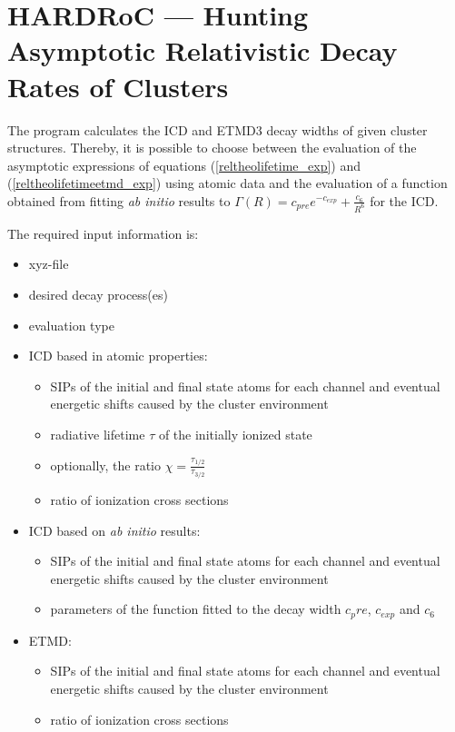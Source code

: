 \section{HARDRoC --- Hunting Asymptotic Relativistic Decay Rates of Clusters}

The program calculates the \ac{ICD} and \ac{ETMD}3 decay widths
of given cluster structures. Thereby, it is possible to choose between
the evaluation of the asymptotic expressions of equations
(\ref{reltheolifetime_exp}) and (\ref{reltheolifetimeetmd_exp}) using
atomic data and the evaluation of a function obtained from fitting
\emph{ab initio} results to $\Gamma(R) = c_{pre} e^{-c_{exp}} + \frac{c_6}{R^6}$
for the ICD.

The required input information is:
\begin{itemize}
 \item xyz-file
 \item desired decay process(es)
 \item evaluation type
 \item ICD based in atomic properties:
       \begin{itemize}
        \item \ac{SIP}s of the initial and final state atoms for each channel and
              eventual energetic shifts caused by the cluster environment
        \item radiative lifetime $\tau$ of the initially ionized state
        \item optionally, the ratio $\chi=\frac{\tau_{1/2}}{\tau_{3/2}}$
        \item ratio of ionization cross sections
       \end{itemize}
 \item ICD based on \emph{ab initio} results:
       \begin{itemize}
        \item \ac{SIP}s of the initial and final state atoms for each channel and
              eventual energetic shifts caused by the cluster environment
        \item parameters of the function fitted to the decay width $c_pre$,
              $c_{exp}$ and $c_6$
       \end{itemize}
 \item ETMD: 
       \begin{itemize}
        \item \ac{SIP}s of the initial and final state atoms for each channel and
              eventual energetic shifts caused by the cluster environment
        \item ratio of ionization cross sections
       \end{itemize}
\end{itemize}

